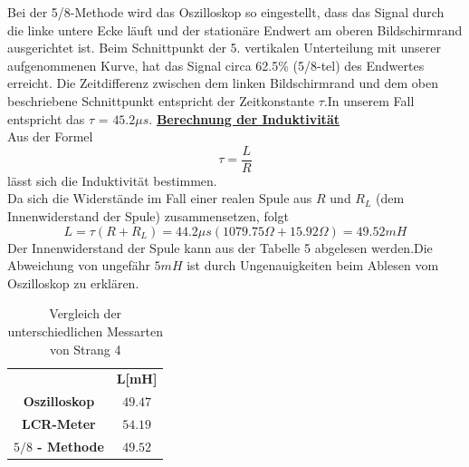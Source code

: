 \documentclass[a4paper,12pt]{article}
\begin{document}
	Bei der 5/8-Methode wird das Oszilloskop so eingestellt, dass das Signal durch die linke untere Ecke läuft und der stationäre Endwert am oberen Bildschirmrand ausgerichtet ist.
	Beim Schnittpunkt der 5. vertikalen Unterteilung mit unserer aufgenommenen Kurve, hat das Signal circa 62.5\% (5/8-tel) des Endwertes erreicht.\newline
	Die Zeitdifferenz zwischen dem linken Bildschirmrand und dem oben beschriebene Schnittpunkt entspricht der Zeitkonstante $\tau$.\newline In unserem Fall entspricht das $\tau$ = $45.2\mu s$.\newline
	\newpage
	\noindent
	\underline{\textbf{Berechnung der Induktivität}}\\ \newline
	Aus der Formel \[
	\tau = \frac{L}{R}
	\] lässt sich die Induktivität bestimmen.\\ \newline
	Da sich die Widerstände im Fall einer realen Spule aus $R$ und $R_L$ (dem Innenwiderstand der Spule) zusammensetzen, folgt
	\[
		L = \tau(R + R_L) = 44.2\mu s(1079.75\Omega + 15.92\Omega) = 49.52mH
	\]Der Innenwiderstand der Spule kann aus der Tabelle 5 abgelesen werden.\newline Die Abweichung von ungefähr $5mH$ ist durch Ungenauigkeiten beim Ablesen vom Oszilloskop zu erklären.
	\begin{table}[h]
		\centering
		\begin{tabular}{|c|c|}
			\hline
			\multicolumn{1}{|c|}{\multirow{2}{*}{}} & \multirow{2}{*}{\textbf{L[mH]}} \\
			\multicolumn{1}{|c|}{} &  \\ \hline
			\multirow{2}{*}{\textbf{Oszilloskop}} & \multirow{2}{*}{$49.47$} \\
			&  \\ \hline
			\multirow{2}{*}{\textbf{LCR-Meter}} & \multirow{2}{*}{$54.19$} \\
			&  \\ \hline
			\multirow{2}{*}{\textbf{$5/8$ - Methode}} & \multirow{2}{*}{$49.52$} \\
			&  \\ \hline
		\end{tabular}
		\caption{Vergleich der unterschiedlichen Messarten von Strang 4}
	\end{table}
	\newpage
\end{document}
